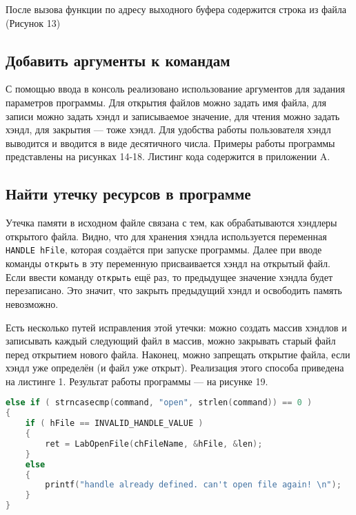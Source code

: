 После вызова функции по адресу выходного буфера содержится строка из файла (Рисунок 13)
\FloatBarrier



\subsection{Добавить аргументы к командам}
С помощью ввода в консоль реализовано использование аргументов для задания параметров программы. Для открытия файлов можно задать имя файла, для записи можно задать хэндл и записываемое значение, для чтения можно задать хэндл, для закрытия — тоже хэндл. Для удобства работы пользователя хэндл выводится и вводится в виде десятичного числа. Примеры работы программы представлены на рисунках 14-18. Листинг кода содержится в приложении A. 

\FloatBarrier


\subsection{Найти утечку ресурсов в программе}
Утечка памяти в исходном файле связана с тем, как обрабатываются хэндлеры открытого файла. Видно, что для хранения хэндла используется переменная \texttt{HANDLE hFile}, которая создаётся при запуске программы. Далее при вводе команды \texttt{открыть} в эту переменную присваивается хэндл на открытый файл. Если ввести команду \texttt{открыть} ещё раз, то предыдущее значение хэндла будет перезаписано. Это значит, что закрыть предыдущий хэндл и освободить память невозможно. 

Есть несколько путей исправления этой утечки: можно создать массив хэндлов и записывать каждый следующий файл в массив, можно закрывать старый файл перед открытием нового файла. Наконец, можно запрещать открытие файла, если хэндл уже определён (и файл уже открыт). Реализация этого способа приведена на листинге 1. Результат работы программы — на рисунке 19.

\begin{lstlisting}[language=c, numbers=none, caption={Фрагмент функции main}]
else if ( strncasecmp(command, "open", strlen(command)) == 0 )
{
    if ( hFile == INVALID_HANDLE_VALUE )
    {
        ret = LabOpenFile(chFileName, &hFile, &len);
    } 
    else 
    {
        printf("handle already defined. can't open file again! \n");
    }
}
\end{lstlisting}

